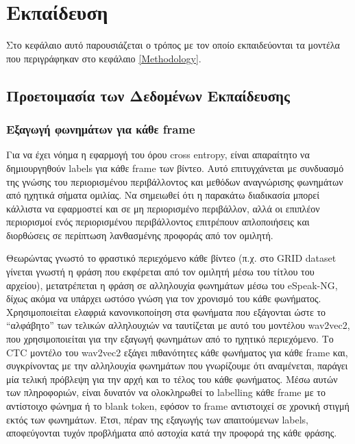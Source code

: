 \section{Εκπαίδευση}
\label{Training}

Στο κεφάλαιο αυτό παρουσιάζεται ο τρόπος με τον οποίο εκπαιδεύονται τα μοντέλα που περιγράφηκαν στο κεφάλαιο \ref{Methodology}.

\subsection{Προετοιμασία των Δεδομένων Εκπαίδευσης}
\label{TrainingData}

\subsubsection{Εξαγωγή φωνημάτων για κάθε frame}
\label{PhonemeExtraction}
Για να έχει νόημα η εφαρμογή του όρου cross entropy, είναι απαραίτητο να δημιουργηθούν labels για κάθε frame των βίντεο. Αυτό επιτυγχάνεται με συνδυασμό της γνώσης του περιορισμένου περιβάλλοντος και μεθόδων αναγνώρισης φωνημάτων από ηχητικά σήματα ομιλίας. Να σημειωθεί ότι η παρακάτω διαδικασία μπορεί κάλλιστα να εφαρμοστεί και σε μη περιορισμένο περιβάλλον, αλλά οι επιπλέον περιορισμοί ενός περιορισμένου περιβάλλοντος επιτρέπουν απλοποιήσεις και διορθώσεις σε περίπτωση λανθασμένης προφοράς από τον ομιλητή.

Θεωρώντας γνωστό το φραστικό περιεχόμενο κάθε βίντεο (π.χ. στο GRID dataset γίνεται γνωστή η φράση που εκφέρεται από τον ομιλητή μέσω του τίτλου του αρχείου), μετατρέπεται η φράση σε αλληλουχία φωνημάτων μέσω του eSpeak-NG, δίχως ακόμα να υπάρχει ωστόσο γνώση για τον χρονισμό του κάθε φωνήματος. Χρησιμοποιείται ελαφριά κανονικοποίηση στα φωνήματα που εξάγονται ώστε το ``αλφάβητο'' των τελικών αλληλουχιών να ταυτίζεται με αυτό του μοντέλου wav2vec2, που χρησιμοποιείται για την εξαγωγή φωνημάτων από το ηχητικό περιεχόμενο. Το CTC μοντέλο του wav2vec2 εξάγει πιθανότητες κάθε φωνήματος για κάθε frame και, συγκρίνοντας με την αλληλουχία φωνημάτων που γνωρίζουμε ότι αναμένεται, παράγει μία τελική πρόβλεψη για την αρχή και το τέλος του κάθε φωνήματος. Μέσω αυτών των πληροφοριών, είναι δυνατόν να ολοκληρωθεί το labelling κάθε frame με το αντίστοιχο φώνημα ή το blank token, εφόσον το frame αντιστοιχεί σε χρονική στιγμή εκτός των φωνημάτων. Έτσι, πέραν της εξαγωγής των απαιτούμενων labels, αποφεύγονται τυχόν προβλήματα από αστοχία κατά την προφορά της κάθε φράσης.

